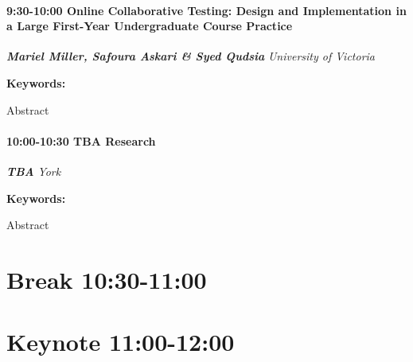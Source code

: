 \documentclass[
]{book}
\begin{document}
\begin{session}
\hypertarget{online-collaborative-testing-design-and-implementation-in-a-large-first-year-undergraduate-course-practice}{%
\paragraph*{\texorpdfstring{9:30-10:00 \textbar{} \textbf{Online
Collaborative Testing: Design and Implementation in a Large First-Year
Undergraduate Course} \textbar{}
Practice}{9:30-10:00 \textbar{} Online Collaborative Testing: Design and Implementation in a Large First-Year Undergraduate Course \textbar{} Practice}}\label{online-collaborative-testing-design-and-implementation-in-a-large-first-year-undergraduate-course-practice}}

\textbf{\emph{Mariel Miller, Safoura Askari \& Syed Qudsia}} \textbar{}
\emph{University of Victoria}

\textbf{Keywords:}

Abstract
\end{session}

\begin{session}
\hypertarget{tba-research}{%
\paragraph*{\texorpdfstring{10:00-10:30 \textbar{} \textbf{TBA}
\textbar{}
Research}{10:00-10:30 \textbar{} TBA \textbar{} Research}}\label{tba-research}}

\textbf{\emph{TBA}} \textbar{} \emph{York}

\textbf{Keywords:}

Abstract
\end{session}

\hypertarget{break-1030-1100-2}{%
\section*{Break \textbar{} 10:30-11:00}\label{break-1030-1100-2}}

\hypertarget{keynote-1100-1200-1}{%
\section*{Keynote \textbar{} 11:00-12:00}\label{keynote-1100-1200-1}}
\end{document}

